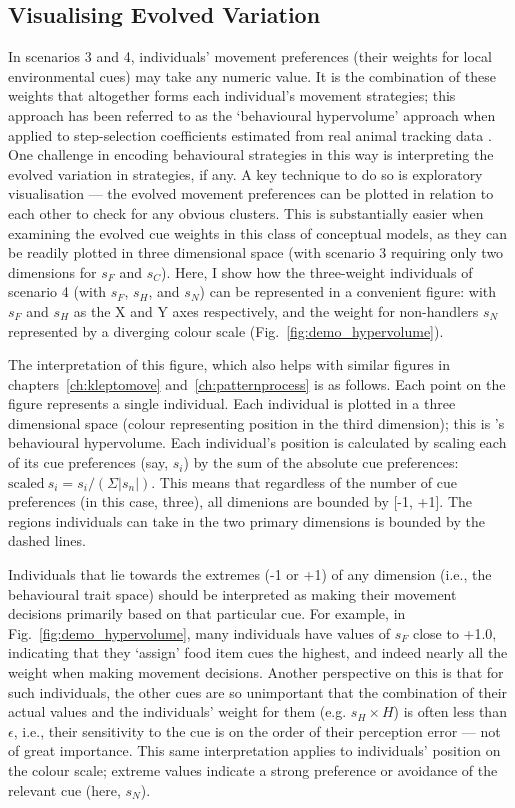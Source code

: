 \begin{interludeenv}
\subsection*{Visualising Evolved Variation}

In scenarios 3 and 4, individuals' movement preferences (their weights for local environmental cues) may take any numeric value.
It is the combination of these weights that altogether forms each individual's movement strategies; this approach has been referred to as the `behavioural hypervolume' approach when applied to step-selection coefficients estimated from real animal tracking data \parencite{bastille-rousseau2019}.
One challenge in encoding behavioural strategies in this way is interpreting the evolved variation in strategies, if any.
A key technique to do so is exploratory visualisation --- the evolved movement preferences can be plotted in relation to each other to check for any obvious clusters.
This is substantially easier when examining the evolved cue weights in this class of conceptual models, as they can be readily plotted in three dimensional space (with scenario 3 requiring only two dimensions for $s_F$ and $s_C$).
Here, I show how the three-weight individuals of scenario 4 (with $s_F$, $s_H$, and $s_N$) can be represented in a convenient figure: with $s_F$ and $s_H$ as the X and Y axes respectively, and the weight for non-handlers $s_N$ represented by a diverging colour scale (Fig.~\ref{fig:demo_hypervolume}).

The interpretation of this figure, which also helps with similar figures in chapters~\ref{ch:kleptomove} and~\ref{ch:patternprocess} is as follows.
Each point on the figure represents a single individual.
Each individual is plotted in a three dimensional space (colour representing position in the third dimension); this is \textcite{bastille-rousseau2019}'s behavioural hypervolume.
Each individual's position is calculated by scaling each of its cue preferences (say, $s_i$) by the sum of the absolute cue preferences: $\text{scaled}~s_i = s_i / (\Sigma |s_n|)$.
This means that regardless of the number of cue preferences (in this case, three), all dimenions are bounded by [-1, +1].
The regions individuals can take in the two primary dimensions is bounded by the dashed lines.

Individuals that lie towards the extremes (-1 or +1) of any dimension (i.e., the behavioural trait space) should be interpreted as making their movement decisions primarily based on that particular cue.
For example, in Fig.~\ref{fig:demo_hypervolume}, many individuals have values of $s_F$ close to +1.0, indicating that they `assign' food item cues the highest, and indeed nearly all the weight when making movement decisions.
Another perspective on this is that for such individuals, the other cues are so unimportant that the combination of their actual values and the individuals' weight for them (e.g. $s_H \times H$) is often less than $\epsilon$, i.e., their sensitivity to the cue is on the order of their perception error --- not of great importance.
This same interpretation applies to individuals' position on the colour scale; extreme values indicate a strong preference or avoidance of the relevant cue (here, $s_N$).


\end{interludeenv}

